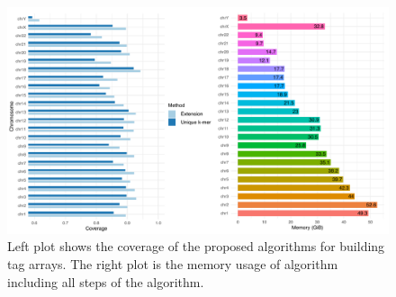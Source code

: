 \documentclass[11pt]{ucthesis}
\begin{document}
\begin{figure}
    \centering
    \includegraphics[width=\linewidth]{Images/results.pdf}
    \caption[Tag array coverage and memory usage]{Left plot shows the coverage of the proposed algorithms for building tag arrays. The right plot is the memory usage of algorithm including all steps of the algorithm. }
    \label{fig:2:7}
\end{figure}
\end{document}
